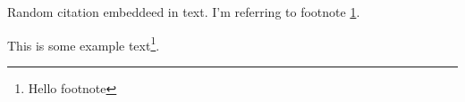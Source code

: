 \documentclass{article}
\begin{document}
Random citation \cite{DUMMY:1} embeddeed in text.
I'm referring to footnote \ref{myfootnote}.

\newpage
This is some example text\footnote{\label{myfootnote}Hello footnote}.


\newpage

 

\end{document}
